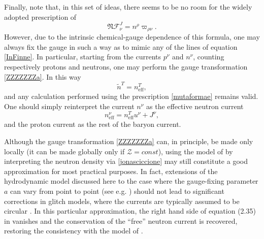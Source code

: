 \documentclass[preprints,article,accept,moreauthors,pdftex]{mdpi}
\begin{document}
Finally, note that, in this set of ideas, there seems to be no room for the widely adopted prescription of \citet{langlois98}
\begin{equation}\label{mutaformae}
       \mathfrak{N} \mathcal{F}^J_\nu = n^\rho \varpi_{\rho \nu}.
\end{equation}
However, due to the intrinsic chemical-gauge dependence of this formula, one may always fix the gauge in such a way as to mimic any of the lines of equation \eqref{InFinne}. In particular, starting from the currents $p^\nu$ and $n^\nu$, counting respectively protons and neutrons, one may perform the gauge transformation \eqref{ZZZZZZZa}. In this way
\begin{equation}
    \tilde{n}^T = n_{\text{eff}}^T,
            \label{jonasciccione}
\end{equation}
and any calculation performed using the prescription \eqref{mutaformae} remains valid. One should simply reinterpret the current $n^\nu$ as the effective neutron current
\begin{equation}
    n_{\text{eff}}^\nu = n_{\text{eff}}^T u^\nu +J^\nu,
\end{equation}
and the proton current as the rest of the baryon current. 

 Although the gauge transformation \eqref{ZZZZZZZa}  can, in principle,  be made only locally 
(it can be made globally only if $\mathcal{Z}=const$), using the model of \citet{langlois98} by interpreting the neutron density via \eqref{jonasciccione} may still constitute a good approximation for most practical purposes. 
In fact,  extensions of the hydrodynamic model discussed here to the case where the gauge-fixing parameter $a$ can vary from point to point (see e.g. \citet{carter_macro_2006}) should not lead to significant corrections in glitch models, where the currents are typically assumed to be circular \citep{sourie_glitch2017,antonelli+2018,GavassinoGeometria,montoli2020A&A}. In this particular approximation, the right hand side of equation (2.35) in \citet{carter_macro_2006} vanishes and the conservation of the ``free'' neutron current is recovered, restoring the consistency with the model of \citet{langlois98}. 

\end{document}
